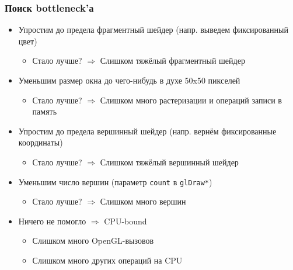 \documentclass{beamer}
\begin{document}
\begin{frame}[fragile]
\fontsize{10pt}{10pt}
\frametitle{Поиск bottleneck'а}
\begin{itemize}
\item Упростим до предела фрагментный шейдер (напр. выведем фиксированный цвет)
\pause
\begin{itemize}
\item Стало лучше? \begin{math}\Rightarrow\end{math} Слишком тяжёлый фрагментный шейдер
\end{itemize}
\pause
\item Уменьшим размер окна до чего-нибудь в духе 50x50 пикселей
\pause
\begin{itemize}
\item Стало лучше? \begin{math}\Rightarrow\end{math} Слишком много растеризации и операций записи в память
\end{itemize}
\pause
\item Упростим до предела вершинный шейдер (напр. вернём фиксированные координаты)
\pause
\begin{itemize}
\item Стало лучше? \begin{math}\Rightarrow\end{math} Слишком тяжёлый вершинный шейдер
\end{itemize}
\pause
\item Уменьшим число вершин (параметр \verb|count| в \verb|glDraw*|)
\pause
\begin{itemize}
\item Стало лучше? \begin{math}\Rightarrow\end{math} Слишком много вершин
\end{itemize}
\pause
\item Ничего не помогло \begin{math}\Rightarrow\end{math} CPU-bound
\pause
\begin{itemize}
\item Слишком много OpenGL-вызовов
\pause
\item Слишком много других операций на CPU
\end{itemize}
\end{itemize}
\end{frame}
\end{document}
